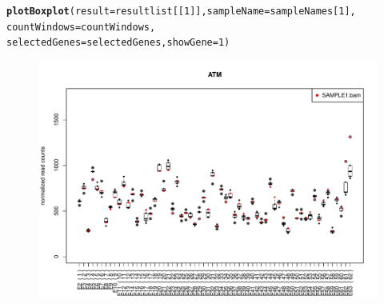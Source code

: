 \documentclass[article]{bioinf}\usepackage[]{graphicx}\usepackage[]{color}
\makeatletter
\newcommand{\hlnum}[1]{\textcolor[rgb]{0.686,0.059,0.569}{#1}}%
\newcommand{\hlstd}[1]{\textcolor[rgb]{0.345,0.345,0.345}{#1}}%
\newcommand{\hlkwc}[1]{\textcolor[rgb]{0.333,0.667,0.333}{#1}}%
\newcommand{\hlkwd}[1]{\textcolor[rgb]{0.737,0.353,0.396}{\textbf{#1}}}%
\newenvironment{kframe}{%
 \def\at@end@of@kframe{}%
 \ifinner\ifhmode%
  \def\at@end@of@kframe{\end{minipage}}%
  \begin{minipage}{\columnwidth}%
 \fi\fi%
 \def\FrameCommand##1{\hskip\@totalleftmargin \hskip-\fboxsep
 \colorbox{shadecolor}{##1}\hskip-\fboxsep
     \hskip-\linewidth \hskip-\@totalleftmargin \hskip\columnwidth}%
 \MakeFramed {\advance\hsize-\width
   \@totalleftmargin\z@ \linewidth\hsize
   \@setminipage}}%
 {\par\unskip\endMakeFramed%
 \at@end@of@kframe}
\newenvironment{knitrout}{}{} %
\makeatother
\begin{document}
\begin{enumerate}
\begin{knitrout}
\color{fgcolor}\begin{kframe}
\begin{alltt}
\hlkwd{plotBoxplot}\hlstd{(}\hlkwc{result} \hlstd{= resultlist[[}\hlnum{1}\hlstd{]],} \hlkwc{sampleName} \hlstd{= sampleNames[}\hlnum{1}\hlstd{],}
            \hlkwc{countWindows} \hlstd{= countWindows,}
            \hlkwc{selectedGenes} \hlstd{= selectedGenes,} \hlkwc{showGene} \hlstd{=} \hlnum{1}\hlstd{)}
\end{alltt}
\end{kframe}
\end{knitrout}




\begin{figure}[H]
\begin{center}
\includegraphics[angle=0,width= 0.9\columnwidth]{001.pdf}
\end{center}
\end{figure}
\end{enumerate}
\end{document}
